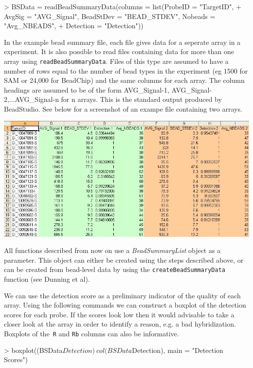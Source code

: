 \documentclass[a4paper]{article}
\newcommand{\Robject}[1]{{\texttt{#1}}}
\newcommand{\Rfunction}[1]{{\texttt{#1}}}
\newcommand{\Rclass}[1]{{\textit{#1}}}
\begin{document}
\begin{Schunk}
\begin{Sinput}
> BSData = readBeadSummaryData(columns = list(ProbeID = "TargetID", 
+     AvgSig = "AVG_Signal", BeadStDev = "BEAD_STDEV", Nobeads = "Avg_NBEADS", 
+     Detection = "Detection"))
\end{Sinput}
\end{Schunk}

In the example bead summary file, each file gives data for a seperate
array in a experiment. It is also possible to read files containing
data for more than one array using \Rfunction{readBeadSummaryData}. Files
of this type are assumed to have a number of rows equal to the number
of bead types in the experiment (eg 1500 for SAM or 24,000 for
BeadChip) and the same columns for each array. The column headings are
assumed to be of the form AVG\_Signal-1, AVG\_Signal-2,...AVG\_Signal-n
for n arrays. This is the standard output produced by BeadStudio. See
below for a screenshot of an exampe file containing two arrays.

\includegraphics{fileformat.jpg}


All functions described from now on use a \Rclass{BeadSummaryList} object as a parameter. This object can either be created using the steps described above, or can be created from bead-level data by using 
the \Rfunction{createBeadSummaryData} function (see Dunning et al).

We can use the detection score as a preliminary indicator of the quality of each array.  Using the following commands we can construct a boxplot of the detection scores for each probe.  If the scores look low then it would advisable to take a closer look at the array in order to identify a reason, e.g. a bad hybridization. Boxplots of the\Robject{ R} and \Robject{Rb} columns can also be informative.

\begin{center}
\begin{Schunk}
\begin{Sinput}
> boxplot((BSData$Detection) ~ col(BSData$Detection), main = "Detection Scores")
\end{Sinput}
\end{Schunk}
\end{center}
\end{document}
